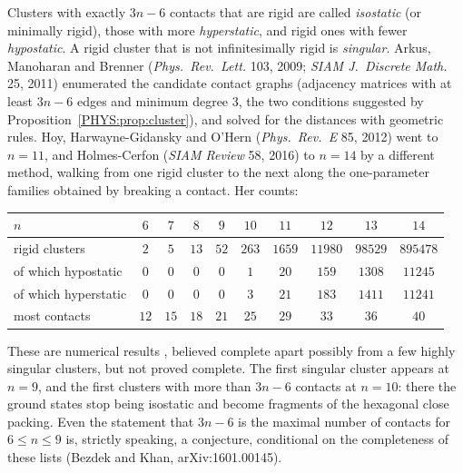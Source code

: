 \documentclass[11pt,openany]{book}
\theoremstyle{plain}
\theoremstyle{definition}
\theoremstyle{remark}
\begin{document}
Clusters with exactly $3n-6$ contacts that are rigid are called \emph{isostatic} (or minimally rigid),
those with more \emph{hyperstatic}, and rigid ones with fewer \emph{hypostatic}. A rigid cluster that is
not infinitesimally rigid is \emph{singular}. Arkus, Manoharan and Brenner (\emph{Phys.\ Rev.\ Lett.} 103, 2009;
\emph{SIAM J.\ Discrete Math.} 25, 2011) enumerated the candidate contact graphs (adjacency matrices with
at least $3n-6$ edges and minimum degree $3$, the two conditions suggested by Proposition~\ref{PHYS:prop:cluster}), and
solved for the distances with geometric rules. Hoy, Harwayne-Gidansky and O'Hern (\emph{Phys.\ Rev.~E} 85,
2012) went to $n=11$, and Holmes-Cerfon (\emph{SIAM Review} 58, 2016) to $n=14$ by a different method,
walking from one rigid cluster to the next along the one-parameter families obtained by breaking a
contact. Her counts:
\begin{center}
\small
\renewcommand{\arraystretch}{1.12}
\begin{tabular}{lccccccccc}
\toprule
$n$ & $6$ & $7$ & $8$ & $9$ & $10$ & $11$ & $12$ & $13$ & $14$\\
\midrule
rigid clusters & $2$ & $5$ & $13$ & $52$ & $263$ & $1659$ & $11980$ & $98529$ & $895478$\\
of which hypostatic & $0$ & $0$ & $0$ & $0$ & $1$ & $20$ & $159$ & $1308$ & $11245$\\
of which hyperstatic & $0$ & $0$ & $0$ & $0$ & $3$ & $21$ & $183$ & $1411$ & $11241$\\
most contacts & $12$ & $15$ & $18$ & $21$ & $25$ & $29$ & $33$ & $36$ & $40$\\
\bottomrule
\end{tabular}
\end{center}
These are numerical results , believed complete apart possibly from a few highly
singular clusters, but not proved complete. The first singular cluster appears at $n=9$, and the first
clusters with more than $3n-6$ contacts at $n=10$: there the ground states stop being isostatic and become
fragments of the hexagonal close packing. Even the statement that $3n-6$ is the maximal number of
contacts for $6\le n\le9$ is, strictly speaking, a conjecture, conditional on the completeness of these
lists (Bezdek and Khan, arXiv:1601.00145).
\end{document}
